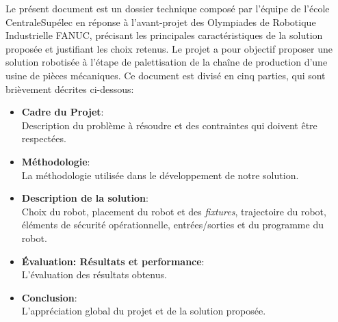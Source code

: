
Le présent document est un dossier technique composé par l’équipe de l’école CentraleSupélec en réponse à l’avant-projet des Olympiades de Robotique Industrielle FANUC, précisant les principales caractéristiques de la solution proposée et justifiant les choix retenus.
Le projet a pour objectif proposer une solution robotisée à l’étape de palettisation de la chaîne de production d’une usine de pièces mécaniques.
Ce document est divisé en cinq parties, qui sont brièvement décrites ci-dessous:


\begin{itemize}[label=$\bullet$]
	\item \textbf{Cadre du Projet}:\\ Description du problème à résoudre et des contraintes qui doivent être respectées.
	\item \textbf{Méthodologie}:\\ La méthodologie utilisée dans le développement de notre solution.
	\item \textbf{Description de la solution}:\\ Choix du robot, placement du robot et des \textit{fixtures}, trajectoire du robot, éléments de sécurité opérationnelle, entrées/sorties et du programme du robot.
	\item \textbf{Évaluation: Résultats et performance}:\\ L’évaluation des résultats obtenus.
	\item \textbf{Conclusion}:\\ L'appréciation global du projet et de la solution proposée.
	
\end{itemize}
\newpage